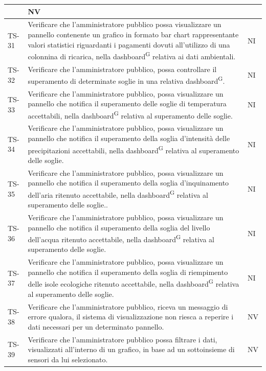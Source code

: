 \documentclass[8pt]{article}
\newcommand{\glossterm}[1]{#1\textsuperscript{G}} %
\begin{document}
\begin{longtable}{|>{\centering}p{2cm}|>{\RaggedRight}m{12cm}|>{\centering\arraybackslash}p{2cm}|}
    & NV \\
    \hline
    TS-31 & Verificare che l'amministratore pubblico possa visualizzare un pannello contenente
    un grafico in formato bar chart rappresentante valori statistici riguardanti i pagamenti dovuti all'utilizzo di una colonnina di ricarica, nella \glossterm{dashboard} relativa ai dati ambientali.
    & NI \\
    \hline
    TS-32 & Verificare che l'amministratore pubblico, possa controllare il superamento di determinate soglie in una relativa \glossterm{dashboard}. &
    NI \\
    \hline
    TS-33 & Verificare che l'amministratore pubblico, possa visualizzare un pannello che notifica il superamento delle soglie di temperatura accettabili, nella \glossterm{dashboard} relativa al superamento delle soglie. &
    NI \\
    \hline
    TS-34 &Verificare che l'amministratore pubblico, possa visualizzare un pannello che notifica il superamento della soglia d'intensità delle precipitazioni accettabili, nella \glossterm{dashboard} relativa al superamento delle soglie. &
    NI \\
    \hline
    TS-35 & Verificare che l'amministratore pubblico, possa visualizzare un pannello che notifica il superamento della soglia d'inquinamento dell'aria ritenuto accettabile, nella \glossterm{dashboard} relativa al superamento delle soglie.. &
    NI \\
    \hline
    TS-36 & Verificare che l'amministratore pubblico, possa visualizzare un pannello che notifica il superamento della soglia del livello dell'acqua ritenuto accettabile, nella \glossterm{dashboard} relativa al superamento delle soglie. &
    NI \\
    \hline
    TS-37 & Verificare che l'amministratore pubblico, possa visualizzare un pannello che notifica il superamento della soglia di riempimento delle isole ecologiche ritenuto accettabile, nella \glossterm{dashboard} relativa al superamento delle soglie. &
    NI \\
    \hline
    TS-38 & Verificare che l'amministratore pubblico, riceva un messaggio di errore qualora, il
    sistema di visualizzazione non riesca a reperire i dati necessari per un determinato pannello. &
    NV \\
    \hline
    TS-39 & Verificare che l'amministratore pubblico possa filtrare i dati, visualizzati
    all’interno di un grafico, in base ad un sottoinsieme di sensori da lui
    selezionato. & NV \\

\end{longtable}
\end{document}

